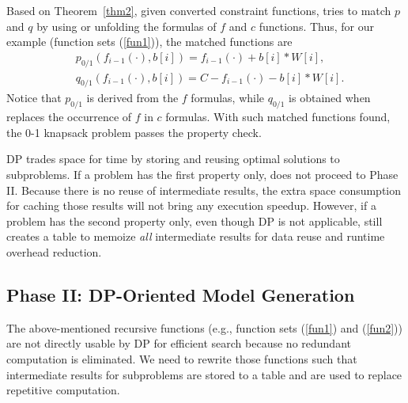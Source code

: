 Based on Theorem~\ref{thm2}, given converted constraint functions, \tool tries to match $p$ and $q$ by using or unfolding the formulas of 
 $f$ and $c$ functions. Thus, for our example (function sets (\ref{fun1})), the matched functions are
\begin{align}
    & p_{0/1}(f_{i-1}(\cdot), b[i])=f_{i-1}(\cdot)+b[i]*W[i], \nonumber\\
    & q_{0/1}(f_{i-1}(\cdot), b[i])=C-f_{i-1}(\cdot)-b[i]*W[i]. \nonumber
\end{align}
Notice that $p_{0/1}$ is derived from the $f$ formulas, while $q_{0/1}$ is obtained when \tool replaces the occurrence of $f$ in $c$ formulas. 
 With such matched functions found, the 0-1 knapsack problem passes the property check. 
 
DP trades space for time by storing and reusing optimal solutions to subproblems. 
If a problem has the first property only, \tool does not proceed to Phase II. Because there is no reuse of intermediate results, the extra space consumption for caching those results will not bring any execution speedup. 
However, if a problem has the second property only, even though DP is not applicable, \tool still creates a table to memoize \emph{all} intermediate results  for data reuse and runtime overhead reduction. 

  
 
 
 \subsection{Phase II: DP-Oriented Model Generation}
 \label{sec:generate}
 
The above-mentioned recursive functions (e.g., function sets (\ref{fun1}) and (\ref{fun2})) are not directly usable by DP for efficient search because no redundant computation is eliminated. 
We need to rewrite those functions 
such that intermediate results for subproblems are stored to a table and are used to replace repetitive computation. 

